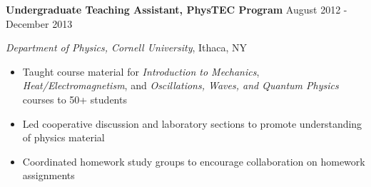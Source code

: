 
\vspace{7pt}

\textbf{Undergraduate Teaching Assistant, PhysTEC Program} \hfill August 2012 - December 2013

\textit{Department of Physics, Cornell University}, Ithaca, NY

\begin{itemize}
    \item Taught course material for \textit{Introduction to Mechanics}, \textit{Heat/Electromagnetism}, and \textit{Oscillations, Waves, \newline and Quantum Physics} courses to 50+ students
    \item Led cooperative discussion and laboratory sections to promote understanding of physics material
    \item Coordinated homework study groups to encourage collaboration on homework assignments
\end{itemize}
